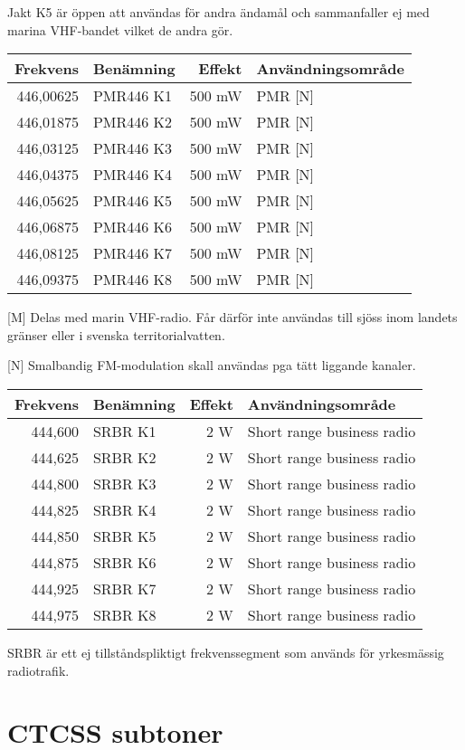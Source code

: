 \documentclass[12pt,swedish,a4paper]{article}
\begin{document}
Jakt K5 är öppen att användas för andra ändamål och sammanfaller ej med marina VHF-bandet vilket de andra gör.

\begin{tabular}{rlrl}
	 Frekvens & Benämning & Effekt & Användningsområde \\ \hline
	446,00625 & PMR446 K1 & 500 mW & PMR [N]              \\
	446,01875 & PMR446 K2 & 500 mW & PMR [N]              \\
	446,03125 & PMR446 K3 & 500 mW & PMR [N]              \\
	446,04375 & PMR446 K4 & 500 mW & PMR [N]              \\
	446,05625 & PMR446 K5 & 500 mW & PMR [N]              \\
	446,06875 & PMR446 K6 & 500 mW & PMR [N]              \\
	446,08125 & PMR446 K7 & 500 mW & PMR [N]              \\
	446,09375 & PMR446 K8 & 500 mW & PMR [N]
\end{tabular}

[M] Delas med marin VHF-radio. Får därför inte användas till sjöss inom landets gränser eller i svenska territorialvatten.

[N] Smalbandig FM-modulation skall användas pga tätt liggande kanaler.


\begin{tabular}{rlrl}
	Frekvens & Benämning & Effekt & Användningsområde          \\ \hline
	 444,600 & SRBR K1   &    2 W & Short range business radio \\
	 444,625 & SRBR K2   &    2 W & Short range business radio \\
	 444,800 & SRBR K3   &    2 W & Short range business radio \\
	 444,825 & SRBR K4   &    2 W & Short range business radio \\
	 444,850 & SRBR K5   &    2 W & Short range business radio \\
	 444,875 & SRBR K6   &    2 W & Short range business radio \\
	 444,925 & SRBR K7   &    2 W & Short range business radio \\
	 444,975 & SRBR K8   &    2 W & Short range business radio
\end{tabular}

SRBR är ett ej tillståndspliktigt frekvenssegment som används för yrkesmässig radiotrafik.

\section{CTCSS subtoner}
\end{document}
